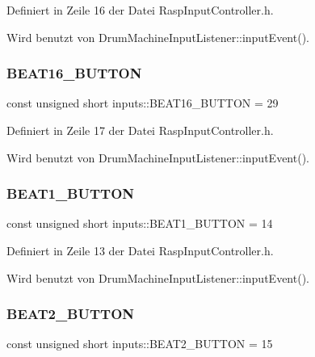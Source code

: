 Definiert in Zeile 16 der Datei Rasp\+Input\+Controller.\+h.



Wird benutzt von Drum\+Machine\+Input\+Listener\+::input\+Event().

\mbox{\label{namespaceinputs_af0f3099a06352ba4eb0808091b908178}} 
\subsubsection{\texorpdfstring{B\+E\+A\+T16\+\_\+\+B\+U\+T\+T\+ON}{BEAT16\_BUTTON}}
{\footnotesize\ttfamily const unsigned short inputs\+::\+B\+E\+A\+T16\+\_\+\+B\+U\+T\+T\+ON = 29}



Definiert in Zeile 17 der Datei Rasp\+Input\+Controller.\+h.



Wird benutzt von Drum\+Machine\+Input\+Listener\+::input\+Event().

\mbox{\label{namespaceinputs_af62021422f469c370f42c78a72504a66}} 
\subsubsection{\texorpdfstring{B\+E\+A\+T1\+\_\+\+B\+U\+T\+T\+ON}{BEAT1\_BUTTON}}
{\footnotesize\ttfamily const unsigned short inputs\+::\+B\+E\+A\+T1\+\_\+\+B\+U\+T\+T\+ON = 14}



Definiert in Zeile 13 der Datei Rasp\+Input\+Controller.\+h.



Wird benutzt von Drum\+Machine\+Input\+Listener\+::input\+Event().

\mbox{\label{namespaceinputs_a8cdd33c9e53b617a2cf8bd32a5b74484}} 
\subsubsection{\texorpdfstring{B\+E\+A\+T2\+\_\+\+B\+U\+T\+T\+ON}{BEAT2\_BUTTON}}
{\footnotesize\ttfamily const unsigned short inputs\+::\+B\+E\+A\+T2\+\_\+\+B\+U\+T\+T\+ON = 15}



